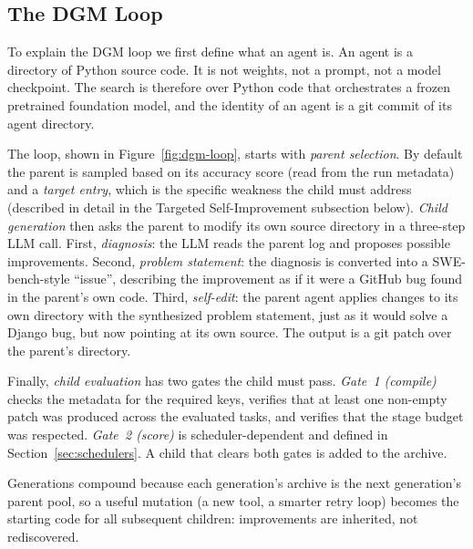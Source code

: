 \subsection{The DGM Loop}

To explain the DGM loop we first define what an agent is. An agent is a
directory of Python source code. It is not weights, not a prompt, not a
model checkpoint. The search is therefore over Python code that
orchestrates a frozen pretrained foundation model, and the identity of
an agent is a git commit of its agent directory.

The loop, shown in Figure~\ref{fig:dgm-loop}, starts with
\emph{parent selection}. By default the parent is
sampled based on its accuracy score (read from the run metadata) and
a \emph{target entry}, which is the specific weakness the child must
address (described in detail in the Targeted Self-Improvement
subsection below).
\emph{Child generation} then asks the parent to modify its own source
directory in a three-step LLM call. First, \emph{diagnosis}: the LLM
reads the parent log and proposes possible improvements. Second,
\emph{problem statement}: the diagnosis is converted into a
SWE-bench-style ``issue'', describing the improvement as if it were a
GitHub bug found in the parent's own code. Third, \emph{self-edit}: the
parent agent applies changes to its own directory with the synthesized
problem statement, just as it would solve a Django bug, but now pointing
at its own source. The output is a git patch over the parent's
directory.

Finally, \emph{child evaluation} has two gates the child must pass.
\emph{Gate~1 (compile)} checks the metadata for the required keys,
verifies that at least one non-empty patch was produced across the
evaluated tasks, and verifies that the stage budget was respected.
\emph{Gate~2 (score)} is scheduler-dependent and defined in
Section~\ref{sec:schedulers}. A child that clears both gates is added
to the archive.

Generations compound because each generation's archive is the next
generation's parent pool, so a useful mutation (a new tool, a smarter
retry loop) becomes the starting code for all subsequent children:
improvements are inherited, not rediscovered.

